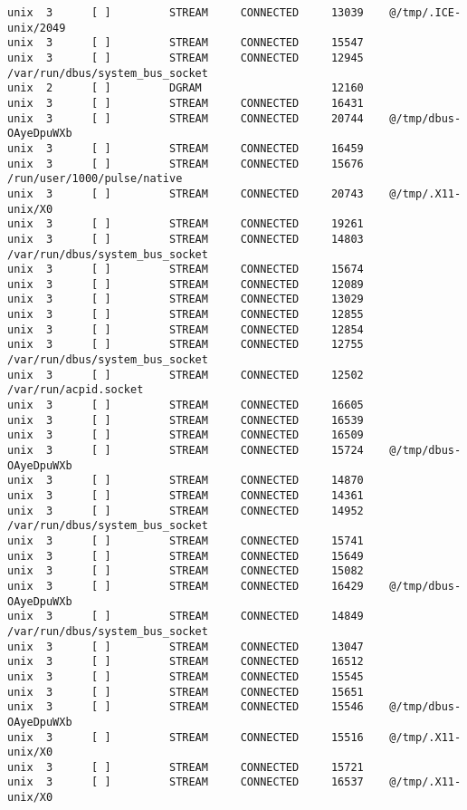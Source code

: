 \begin{lstlisting}
unix  3      [ ]         STREAM     CONNECTED     13039    @/tmp/.ICE-unix/2049
unix  3      [ ]         STREAM     CONNECTED     15547    
unix  3      [ ]         STREAM     CONNECTED     12945    /var/run/dbus/system_bus_socket
unix  2      [ ]         DGRAM                    12160    
unix  3      [ ]         STREAM     CONNECTED     16431    
unix  3      [ ]         STREAM     CONNECTED     20744    @/tmp/dbus-OAyeDpuWXb
unix  3      [ ]         STREAM     CONNECTED     16459    
unix  3      [ ]         STREAM     CONNECTED     15676    /run/user/1000/pulse/native
unix  3      [ ]         STREAM     CONNECTED     20743    @/tmp/.X11-unix/X0
unix  3      [ ]         STREAM     CONNECTED     19261    
unix  3      [ ]         STREAM     CONNECTED     14803    /var/run/dbus/system_bus_socket
unix  3      [ ]         STREAM     CONNECTED     15674    
unix  3      [ ]         STREAM     CONNECTED     12089    
unix  3      [ ]         STREAM     CONNECTED     13029    
unix  3      [ ]         STREAM     CONNECTED     12855    
unix  3      [ ]         STREAM     CONNECTED     12854    
unix  3      [ ]         STREAM     CONNECTED     12755    /var/run/dbus/system_bus_socket
unix  3      [ ]         STREAM     CONNECTED     12502    /var/run/acpid.socket
unix  3      [ ]         STREAM     CONNECTED     16605    
unix  3      [ ]         STREAM     CONNECTED     16539    
unix  3      [ ]         STREAM     CONNECTED     16509    
unix  3      [ ]         STREAM     CONNECTED     15724    @/tmp/dbus-OAyeDpuWXb
unix  3      [ ]         STREAM     CONNECTED     14870    
unix  3      [ ]         STREAM     CONNECTED     14361    
unix  3      [ ]         STREAM     CONNECTED     14952    /var/run/dbus/system_bus_socket
unix  3      [ ]         STREAM     CONNECTED     15741    
unix  3      [ ]         STREAM     CONNECTED     15649    
unix  3      [ ]         STREAM     CONNECTED     15082    
unix  3      [ ]         STREAM     CONNECTED     16429    @/tmp/dbus-OAyeDpuWXb
unix  3      [ ]         STREAM     CONNECTED     14849    /var/run/dbus/system_bus_socket
unix  3      [ ]         STREAM     CONNECTED     13047    
unix  3      [ ]         STREAM     CONNECTED     16512    
unix  3      [ ]         STREAM     CONNECTED     15545    
unix  3      [ ]         STREAM     CONNECTED     15651    
unix  3      [ ]         STREAM     CONNECTED     15546    @/tmp/dbus-OAyeDpuWXb
unix  3      [ ]         STREAM     CONNECTED     15516    @/tmp/.X11-unix/X0
unix  3      [ ]         STREAM     CONNECTED     15721    
unix  3      [ ]         STREAM     CONNECTED     16537    @/tmp/.X11-unix/X0

\end{lstlisting}
